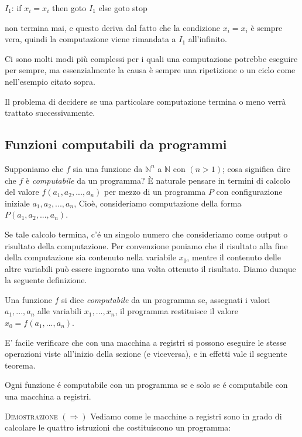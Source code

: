 \begin{mylisting}
$I_1$: if $x_i = x_i $ then goto $I_1$ else goto stop
\end{mylisting}	
non termina mai, e questo deriva dal fatto che la condizione $x_i =
x_i $ \`e sempre vera, quindi la computazione viene rimandata a $I_1$
all'infinito.
	
Ci sono molti modi pi\`u complessi per i quali una computazione
potrebbe eseguire per sempre, ma essenzialmente la causa \`e sempre
una ripetizione o un ciclo come nell'esempio citato sopra.
	
Il problema di decidere se una particolare computazione termina o meno
verr\`a trattato successivamente.\\

\subsection{Funzioni computabili da programmi}
Supponiamo che $f$ sia una funzione da $\mathbb{N}^n$ a $ \mathbb{N}$
con $(n > 1)$; cosa significa dire che $f$ \`e \emph{computabile}
da un programma? \`E naturale pensare in termini di calcolo del valore
$f(a_1, a_2, ... , a_n)$ per mezzo di un programma $P$ con
configurazione iniziale $a_1, a_2, ... , a_n$, Cio\`e, consideriamo
computazione della forma $P(a_1, a_2, ... , a_n)$.

Se tale calcolo termina, c'é un singolo numero che consideriamo come
output o risultato della computazione. Per convenzione poniamo che il
risultato alla fine della computazione sia contenuto nella variabile
$x_0$, mentre il contenuto delle altre variabili pu\`o essere
ingnorato una volta ottenuto il risultato. Diamo dunque la seguente
definizione.

\begin{programmi}
Una funzione $f$ si dice \emph{computabile} da un programma se,
assegnati i valori $a_1,...,a_n$ alle variabili $x_1,...,x_n$, il
programma restituisce il valore $x_0=f(a_1,...,a_n)$.
\end{programmi}

E' facile verificare che con una macchina a registri si possono
eseguire le stesse operazioni viste all'inizio della sezione (e
viceversa), e in effetti vale il seguente teorema.
\begin{progabaco}
Ogni funzione \'e computabile con un programma se e solo se \'e
computabile con una macchina a registri.
\end{progabaco}
\textsc{Dimostrazione} $(\Rightarrow)$ Vediamo come le macchine a
registri sono in grado di calcolare le quattro istruzioni che
costituiscono un programma:\\

